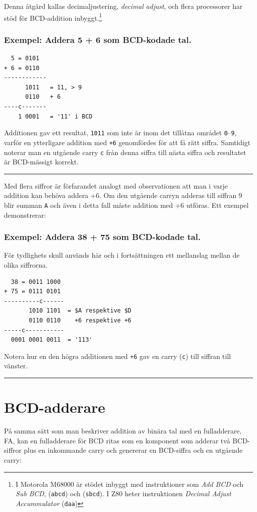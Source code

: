 \documentclass[oneside,10pt,a4paper,swedish]{scrbook}
\newcommand{\startex}[1]{\subsubsection{Exempel: #1}}
\newcommand{\slutex}{\vspace{-8mm}\begin{flushright} \rule{1ex}{1ex} \end{flushright}}
\newcommand{\asm}[1]{\texttt{#1}}
\begin{document}
Denna åtgärd kallas decimaljustering, \emph{decimal adjust}, och flera processorer har stöd för BCD-addition inbyggt.\footnote{I Motorola M68000 är stödet inbyggt med instruktioner som \emph{Add BCD} och \emph{Sub BCD}, (\asm{abcd}) och (\asm{sbcd}). I Z80 heter instruktionen \emph{Decimal Adjust Accummulator} (\asm{daa})} 
\startex{Addera 5 + 6 som BCD-kodade tal.}

\begin{center}
\begin{lstlisting}
  5 = 0101
+ 6 = 0110
------------
      1011   = 11, > 9
      0110   + 6 
----c-------
    1 0001   = '11' i BCD
\end{lstlisting}
\end{center}

Additionen gav ett resultat, \asm{1011} som inte är inom det tillåtna området \asm{0}--\asm{9}, varför en ytterligare addition med \asm{+6} genomfördes för att få rätt siffra. Samtidigt noterar man en utgående carry \asm{c} från denna siffra till nästa siffra och resultatet är BCD-mässigt korrekt. 
\slutex

\newpage

Med flera siffror är förfarandet analogt med observationen att man i varje addition kan behöva addera +6. Om den utgående carryn adderas till siffran 9 blir summan \asm{A} och även i detta fall måste addition med +6 utföras. Ett exempel demonstrerar:

\startex{Addera 38 + 75 som BCD-kodade tal.}
För tydlighets skull används här och i fortsättningen ett mellanslag mellan de olika siffrorna. 

\begin{center}
\begin{lstlisting}
  38 = 0011 1000
+ 75 = 0111 0101
----------c------
       1010 1101  = $A respektive $D
       0110 0110    +6 respektive +6
-----c-----------
  0001 0001 0011  = '113' 
\end{lstlisting}
\end{center}
Notera hur en den högra additionen med \asm{+6} gav en carry (\asm{c}) till siffran till vänster.
\slutex

\section{BCD-adderare} På samma sätt som man beskriver addition av binära tal med en fulladderare, FA, kan en full\-adderare för BCD ritas som en komponent som adderar två BCD-siffror plus en inkommande carry och genererar en  BCD-siffra och en utgående carry:
\end{document}
